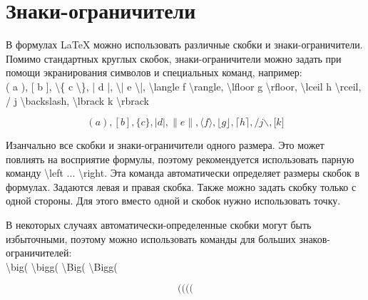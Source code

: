 \documentclass[a4paper,12pt]{article}
\begin{document}
{\section{Знаки-ограничители}
\hspace{1.25cm}В формулах LaTeX можно использовать различные скобки и знаки-ограничители.
Помимо стандартных круглых скобок, знаки-ограничители можно задать при помощи экранирования символов и специальных команд, например:\\
\textsf{( a ), [ b ], \textbackslash\{ c \textbackslash\}, | d |, \textbackslash| e \textbackslash|,
\textbackslash langle f \textbackslash rangle, \textbackslash lfloor g \textbackslash rfloor,
\textbackslash lceil h \textbackslash rceil,\\
/ j \textbackslash backslash, \textbackslash lbrack k \textbackslash rbrack}

\begin{equation*}
( a ), [ b ], \{ c \}, | d |, \| e \|,
\langle f \rangle, \lfloor g \rfloor,
\lceil h \rceil,
/ j \backslash, \lbrack k \rbrack
\end{equation*}

Изанчально все скобки и знаки-ограничители одного размера.
Это может пов\-ли\-ять на восприятие формулы, поэтому рекомендуется использовать парную команду \textsf{\textbackslash left ... \textbackslash right}.
Эта команда автоматически определяет размеры скобок в формулах. Задаются левая и правая скобка. Также можно задать скобку только с одной стороны.
Для этого вместо одной и скобок нужно использовать точку.

В некоторых случаях автоматически-определенные скобки могут быть избыточ\-ными, поэтому можно использовать команды для больших знаков-ограничителей:\\
\textbackslash big( \textbackslash bigg( \textbackslash Big( \textbackslash Bigg(

$$\big( \bigg( \Big( \Bigg($$

}
\end{document}
